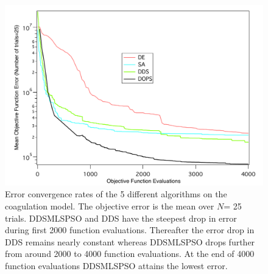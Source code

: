 \documentclass[12pt]{article}
\begin{document}
\begin{figure}[h]
\centering
\includegraphics[width=1.0\textwidth,height=0.5\textheight]{./figs/Figure_3_Errors_convergence.pdf}
\caption{Error convergence rates of the 5 different algorithms on the coagulation model. The objective error is the mean over $N$= 25 trials. DDSMLSPSO and DDS have the steepest drop in error during first 2000 function evaluations. Thereafter the error drop in DDS remains nearly constant whereas DDSMLSPSO drops further from around 2000 to 4000 function evaluations. At the end of 4000 function evaluations DDSMLSPSO attains the lowest error.
}\label{fig-train}
\end{figure}

\clearpage
\end{document}
